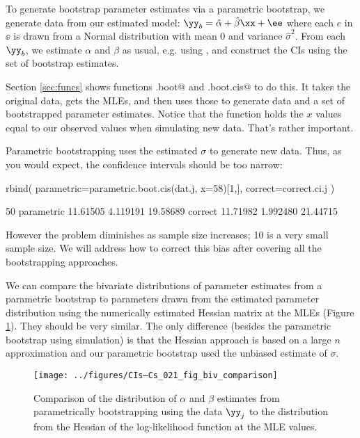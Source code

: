 To generate bootstrap parameter estimates via a parametric bootstrap, we generate data from our estimated model:
$\yy_b= \hat{\alpha}+\hat{\beta} \xx + \ee$
where each $e$ in  $\ee$ is drawn from a Normal distribution with mean 0 and variance $\hat\sigma^2$.  From each $\yy_b$, we estimate $\alpha$ and $\beta$ as usual, e.g. using \verb@lm@, and construct the CIs using the set of bootstrap estimates.  

Section \ref{sec:funcs} shows functions \verb@parametric.boot@ and \verb@parametric.boot.cis@ to do this.  It takes the original data, gets the MLEs, and then uses those to generate data and a set of bootstrapped parameter estimates.  Notice that the function holds the $x$ values equal to our observed values when simulating new data.  That's rather important.


Parametric bootstrapping uses the estimated $\sigma$ to generate new data.  Thus, as you would expect, the confidence intervals should be too narrow:
\begin{Schunk}
\begin{Sinput}
 rbind(
   parametric=parametric.boot.cis(dat.j, x=58)[1,],
   correct=correct.ci.j
 )
\end{Sinput}
\begin{Soutput}
                50%     2.5%    97.5%
parametric 11.61505 4.119191 19.58689
correct    11.71982 1.992480 21.44715
\end{Soutput}
\end{Schunk}
However the problem diminishes as sample size increases; 10 is a very small sample size.  We will address how to correct this bias after covering all the bootstrapping approaches.

We can compare the bivariate distributions of parameter estimates from a parametric bootstrap to parameters drawn from the estimated parameter distribution using the numerically estimated Hessian matrix at the MLEs (Figure \ref{fig:dist.of.ests.est.vs.true}).  They should be very similar.  The only difference (besides the parametric bootstrap using simulation) is that the Hessian approach is based on a large $n$ approximation and our parametric bootstrap used the unbiased estimate of $\sigma$.

\begin{figure}[htp]
\begin{center}
\texttt{[image: ../figures/CIs--Cs\_021\_fig\_biv\_comparison]}
\end{center}
\caption{Comparison of the distribution of $\alpha$ and $\beta$ estimates from parametrically bootstrapping using the data $\yy_j$ to the distribution from the Hessian of the log-likelihood function at the MLE values.}
\label{fig:dist.of.ests.est.vs.true}
\end{figure}

